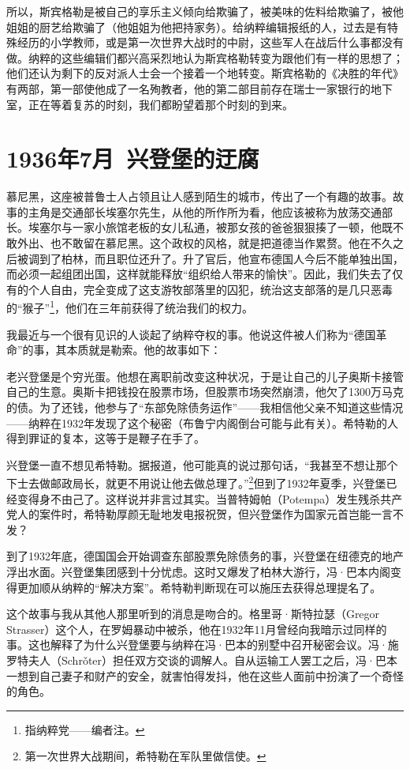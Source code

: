 \documentclass[UTF8]{ctexart}
\begin{document}
所以，斯宾格勒是被自己的享乐主义倾向给欺骗了，被美味的佐料给欺骗了，被他姐姐的厨艺给欺骗了（他姐姐为他把持家务）。给纳粹编辑报纸的人，过去是有特殊经历的小学教师，或是第一次世界大战时的中尉，这些军人在战后什么事都没有做。纳粹的这些编辑们都兴高采烈地认为斯宾格勒转变为跟他们有一样的思想了；他们还认为剩下的反对派人士会一个接着一个地转变。斯宾格勒的《决胜的年代》有两部，第一部使他成了一名殉教者，他的第二部目前存在瑞士一家银行的地下室，正在等着复苏的时刻，我们都盼望着那个时刻的到来。

\section{1936年7月\ 兴登堡的迂腐}

慕尼黑，这座被普鲁士人占领且让人感到陌生的城市，传出了一个有趣的故事。故事的主角是交通部长埃塞尔先生，从他的所作所为看，他应该被称为放荡交通部长。埃塞尔与一家小旅馆老板的女儿私通，被那女孩的爸爸狠狠揍了一顿，他既不敢外出、也不敢留在慕尼黑。这个政权的风格，就是把道德当作累赘。他在不久之后被调到了柏林，而且职位还升了。升了官后，他宣布德国人今后不能单独出国，而必须一起组团出国，这样就能释放“组织给人带来的愉快”。因此，我们失去了仅有的个人自由，完全变成了这支游牧部落里的囚犯，统治这支部落的是几只恶毒的“猴子”\footnote{指纳粹党——编者注。}，他们在三年前获得了统治我们的权力。

我最近与一个很有见识的人谈起了纳粹夺权的事。他说这件被人们称为“德国革命”的事，其本质就是勒索。他的故事如下：

老兴登堡是个穷光蛋。他想在离职前改变这种状况，于是让自己的儿子奥斯卡接管自己的生意。奥斯卡把钱投在股票市场，但股票市场突然崩溃，他欠了1300万马克的债。为了还钱，他参与了“东部免除债务运作”——我相信他父亲不知道这些情况——纳粹在1932年发现了这个秘密（布鲁宁内阁倒台可能与此有关）。希特勒的人得到罪证的复本，这等于是鞭子在手了。

兴登堡一直不想见希特勒。据报道，他可能真的说过那句话，“我甚至不想让那个下士去做邮政局长，就更不用说让他去做总理了。”\footnote{第一次世界大战期间，希特勒在军队里做信使。}但到了1932年夏季，兴登堡已经变得身不由己了。这样说并非言过其实。当普特姆帕（Potempa）发生残杀共产党人的案件时，希特勒厚颜无耻地发电报祝贺，但兴登堡作为国家元首岂能一言不发？

到了1932年底，德国国会开始调查东部股票免除债务的事，兴登堡在纽德克的地产浮出水面。兴登堡集团感到十分忧虑。这时又爆发了柏林大游行，冯·巴本内阁变得更加顺从纳粹的“解决方案”。希特勒判断现在可以施压去获得总理提名了。

这个故事与我从其他人那里听到的消息是吻合的。格里哥·斯特拉瑟（Gregor Strasser）这个人，在罗姆暴动中被杀，他在1932年11月曾经向我暗示过同样的事。这也解释了为什么兴登堡要与纳粹在冯·巴本的别墅中召开秘密会议。冯·施罗特夫人（Schrǒter）担任双方交谈的调解人。自从运输工人罢工之后，冯·巴本一想到自己妻子和财产的安全，就害怕得发抖，他在这些人面前中扮演了一个奇怪的角色。
\end{document}
